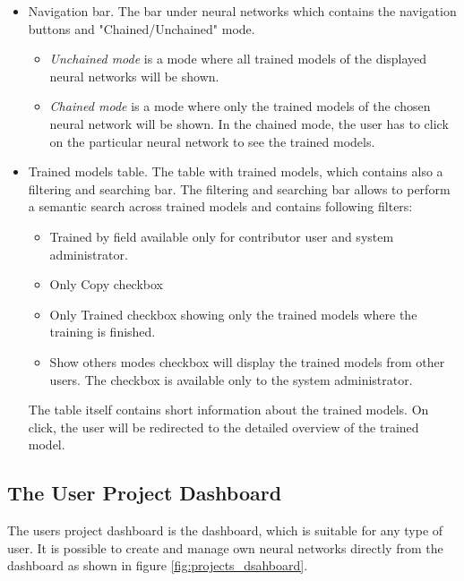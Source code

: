 \begin{itemize}
\item{Navigation bar.} The bar under neural networks which contains the navigation buttons and "Chained/Unchained" mode.
\begin{itemize}
\item \emph{Unchained mode} is a mode where all trained models of the displayed neural networks will be shown.
\item \emph{Chained mode} is a mode where only the trained models of the chosen neural network will be shown. In the chained mode, the user has to click on the particular neural network to see the trained models. 
\end{itemize}

\item{Trained models table.} The table with trained models, which contains also a filtering and searching bar.
The filtering and searching bar allows to perform a semantic search across trained models and contains following filters:
\begin{itemize}
\item Trained by field available only for contributor user and system administrator.
\item Only Copy checkbox
\item Only Trained checkbox showing only the trained models where the training is finished.
\item Show others modes checkbox will display the trained models from other users. The checkbox is available only to the system administrator.
\end{itemize}

The table itself contains short information about the trained models. On click, the user will be redirected to the detailed overview of the trained model.

\end{itemize}

\subsection{The User Project Dashboard}\label{The user projects dashboard}
The users project dashboard is the dashboard, which is suitable for any type of user. It is possible to create and manage own neural networks directly from the dashboard as shown in figure \ref{fig:projects_dsahboard}.

